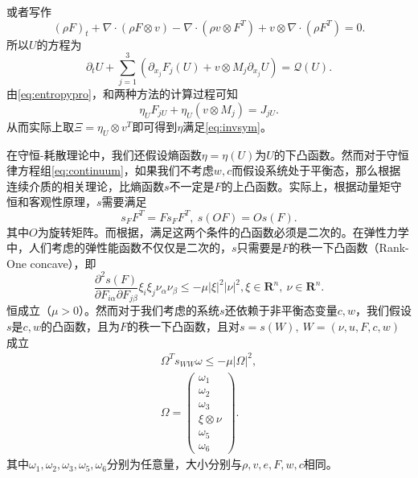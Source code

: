 \documentclass{article}
\begin{document}
或者写作
\begin{equation*}
(\rho F)_t + \nabla \cdot (\rho F \otimes v) - \nabla \cdot (\rho v \otimes F^T) + v \otimes \nabla \cdot (\rho F^T) = 0 .
\end{equation*}
所以$U$的方程为
\begin{equation*}
	\partial_t U + \sum_{j=1}^3 (\partial_{x_j} F_j(U) + v\otimes M_j \partial_{x_j} U)= \mathcal{Q} (U) .
\end{equation*}
由\eqref{eq:entropypro}，和两种方法的计算过程可知
\begin{equation*}
	\eta_U F_{jU} + \eta_{U} (v \otimes M_{j}) = J_{jU}.
\end{equation*}
从而实际上取$\Xi = \eta_U \otimes v^T$即可得到$\eta$满足\eqref{eq:invsym}。

在守恒-耗散理论中，我们还假设熵函数$\eta=\eta(U)$为$U$的下凸函数。然而对于守恒律方程组\eqref{eq:continuum}，如果我们不考虑$w,c$而假设系统处于平衡态，那么根据连续介质的相关理论\cite{}，比熵函数$s$不一定是$F$的上凸函数。实际上，根据动量矩守恒和客观性原理，$s$需要满足
\begin{equation}\label{eq:sObjective}
	s_F F^T = F s_F F^T, \ s(OF) = O s(F).
\end{equation}
其中$O$为旋转矩阵\cite{}。而根据\cite{}，满足这两个条件的凸函数必须是二次的。在弹性力学中，人们考虑的弹性能函数不仅仅是二次的，$s$只需要是$F$的秩一下凸函数（Rank-One concave），即
\begin{equation*}
	\frac{\partial^2 s(F)}{\partial F_{i\alpha} \partial F_{j\beta}} \xi_i \xi_j \nu_\alpha \nu_\beta \le -\mu |\xi|^2 |\nu|^2, \xi \in \mathbf{R}^n, \ \nu \in \mathbf{R}^n. 
\end{equation*}
恒成立（$\mu>0$）。然而对于我们考虑的系统$s$还依赖于非平衡态变量$c,w$，我们假设$s$是$c,w$的凸函数，且为$F$的秩一下凸函数，且对$s=s(W),\ W= (\nu,u,F,c,w)$成立
\begin{eqnarray}
	\Omega^T s_{WW} \omega \le -\mu |\Omega|^2, \label{eq:FCDFconvex}\\ 
	\Omega = \left( \begin{array}{c}
		\omega_1 \\ \omega_2 \\ \omega_3 \\ \xi \otimes \nu \\ \omega_5 \\ \omega_6
	\end{array}\right). \nonumber
\end{eqnarray}
其中$\omega_1,\omega_2,\omega_3,\omega_5,\omega_6$分别为任意量，大小分别与$\rho, v,e, F,w,c$相同。
\end{document}
